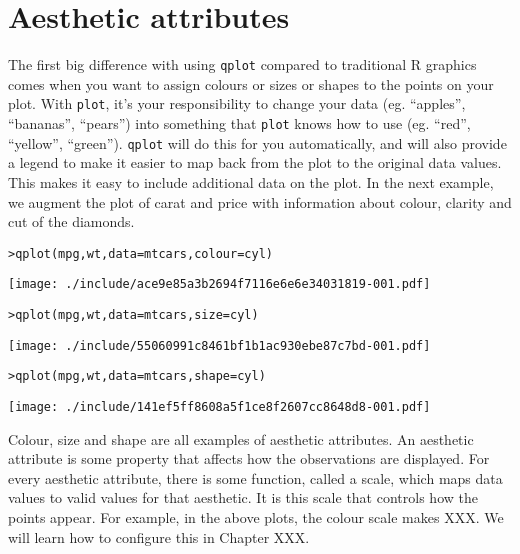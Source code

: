 \section{Aesthetic attributes}\label{sec:aesthetic_attributes}

The first big difference with using {\tt qplot} compared to traditional R graphics comes when you want to assign colours or sizes or shapes to the points on your plot.  With {\tt plot}, it's your responsibility to change your data (eg. ``apples'', ``bananas'', ``pears'') into something that {\tt plot} knows how to use (eg. ``red'', ``yellow'', ``green'').  {\tt qplot} will do this for you automatically, and will also provide a legend to make it easier to map back from the plot to the original data values.  This makes it easy to include additional data on the plot.  In the next example, we augment the plot of carat and price with information about colour, clarity and cut of the diamonds.

\begin{alltt}
> qplot(mpg, wt, data = mtcars, colour = cyl)
\end{alltt}
\texttt{[image: ./include/ace9e85a3b2694f7116e6e6e34031819-001.pdf]}
\begin{alltt}

> qplot(mpg, wt, data = mtcars, size = cyl)
\end{alltt}
\texttt{[image: ./include/55060991c8461bf1b1ac930ebe87c7bd-001.pdf]}
\begin{alltt}

> qplot(mpg, wt, data = mtcars, shape = cyl)
\end{alltt}
\texttt{[image: ./include/141ef5ff8608a5f1ce8f2607cc8648d8-001.pdf]}
\begin{alltt}

\end{alltt}

Colour, size and shape are all examples of aesthetic attributes.  An aesthetic attribute is some property that affects how the observations are displayed.  For every aesthetic attribute, there is some function, called a scale, which maps data values to valid values for that aesthetic.  It is this scale that controls how the points appear.  For example, in the above plots, the colour scale makes XXX.  We will learn how to configure this in Chapter XXX.

